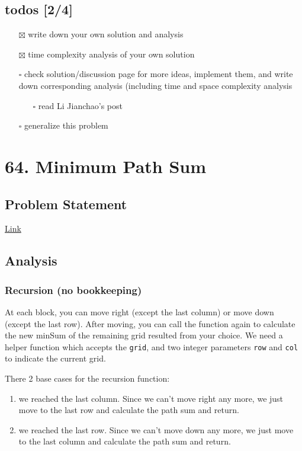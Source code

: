 \documentclass[11pt]{article}
\begin{document}
\subsection{todos [2/4]}
\label{sec:org95ef3e0}
\begin{itemize}
\item[{$\boxtimes$}] write down your own solution and analysis
\item[{$\boxtimes$}] time complexity analysis of your own solution
\item[{$\square$}] check solution/discussion page for more ideas, implement them, and write down corresponding analysis (including time and space complexity analysis
\begin{itemize}
\item[{$\square$}] read Li Jianchao's post
\end{itemize}

\item[{$\square$}] generalize this problem
\end{itemize}
\section{64. Minimum Path Sum}
\label{sec:org9763432}
\subsection{Problem Statement}
\label{sec:org2821f9c}
\href{https://leetcode.com/problems/minimum-path-sum/}{Link}
\subsection{Analysis}
\label{sec:org919eb66}
\subsubsection{Recursion (no bookkeeping)}
\label{sec:org57658e4}
At each block, you can move right (except the last column) or move down (except the last row). After moving, you can call the function again to calculate the new minSum of the remaining grid resulted from your choice. We need a helper function which accepts the \texttt{grid}, and two integer parameters \texttt{row} and \texttt{col} to indicate the current grid.

There 2 base cases for the recursion function:
\begin{enumerate}
\item we reached the last column. Since we can't move right any more, we just move to the last row and calculate the path sum and return.
\item we reached the last row. Since we can't move down any more, we just move to the last column and calculate the path sum and return.
\end{enumerate}
\end{document}
